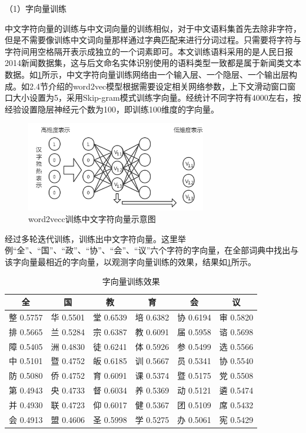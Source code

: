\documentclass[winfonts,master,oneside,nobackinfo]{njuthesis}
\begin{document}
（1）字向量训练

中文字符向量的训练与中文词向量的训练相似，对于中文语料集首先去除非字符，但是不需要像训练中文词向量那样通过字典匹配来进行分词过程。只需要将字符与字符间用空格隔开表示成独立的一个词素即可。本文训练语料采用的是人民日报2014新闻数据集，这与后文命名实体识别使用的语料类型一致都是属于新闻类文本数据。如\ref{char2vec}所示，中文字符向量训练网络由一个输入层、一个隐层、一个输出层构成。如2.4节介绍的word2vec模型根据需要设定相关网络参数，上下文滑动窗口窗口大小设置为5，采用Skip-gram模式训练字向量。经统计不同字符有4000左右，按经验设置隐层神经元个数为100，即训练100维度的字向量。

\begin{figure}[h]
\centering
\includegraphics[width=0.7\textwidth]{./figure/char2vec.jpg}
\caption{word2vecc训练中文字符向量示意图}
\label{char2vec}
\end{figure}

经过多轮迭代训练，训练出中文字符向量。这里举例“全”、“国”、“政”、“协”、“会”、“议”六个字符的字向量，在全部词典中找出与该字向量最相近的字向量，以观测字向量训练的效果，结果如\ref{char_embedding}所示。

\begin{table}[h]
\centering
\begin{tabular}{cccccc} %
\hline 
全& 国& 教& 育& 会& 议\\
\hline  
整 0.5757& 华 0.5501& 堂 0.6539& 培 0.6382&协 0.6194&审 0.5820\\
排 0.5665& 兰 0.5284& 宗 0.6387& 教 0.6091&届 0.5958&谘 0.5698\\
障 0.5405& 洲 0.4830& 徒 0.6241& 体 0.5926&参 0.5499&选 0.5566\\
中 0.5101& 暨 0.4752& 皈 0.6185& 训 0.5667&员 0.5341&协 0.5540\\
防 0.5080& 侨 0.4752& 育 0.6091& 课 0.5374&暨 0.5175&党 0.5508\\
第 0.4943& 央 0.4733& 督 0.6034& 养 0.5369&动 0.5121&遴 0.5474\\
并 0.4930& 联 0.4723& 仰 0.6017& 健 0.5367&团 0.5109&席 0.5432\\
会 0.4913& 盟 0.4606& 圣 0.5998& 学 0.5275&办 0.5061&宪 0.5429\\
\hline 
\end{tabular}
\caption{字向量训练效果}
\label{char_embedding}
\end{table}
\end{document}
